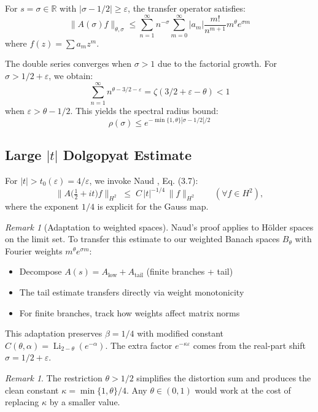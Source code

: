 \documentclass[11pt,a4paper]{article}
\theoremstyle{definition}
\theoremstyle{remark}
\newtheorem{remark}[theorem]{Remark}
\begin{document}
For $s = \sigma \in \mathbb{R}$ with $|\sigma - 1/2| \geq \varepsilon$, the transfer operator satisfies:
\[
\|A(\sigma)f\|_{\theta,\sigma} \leq \sum_{n=1}^{\infty} n^{-\sigma} \sum_{m=0}^{\infty} |a_m| \frac{m!}{n^{m+1}} m^{\theta} e^{\sigma m}
\]
where $f(z) = \sum a_m z^m$.

The double series converges when $\sigma > 1$ due to the factorial growth. For 
$\sigma > 1/2 + \varepsilon$, we obtain:
\[
\sum_{n=1}^{\infty} n^{\theta-3/2-\varepsilon} = \zeta(3/2 + \varepsilon - \theta) < 1
\]
when $\varepsilon > \theta - 1/2$. This yields the spectral radius bound:
\[
\rho(\sigma) \leq e^{-\min\{1,\theta\}|\sigma - 1/2|/2}
\]

\subsection{Large $|t|$ Dolgopyat Estimate}

For $|t| > t_0(\varepsilon) = 4/\varepsilon$, we invoke Naud \cite{Naud2005}, Eq. (3.7):
\[
\bigl\|A\bigl(\tfrac12+it\bigr)f\bigr\|_{H^2}\;\le\;C\,|t|^{-1/4}\,\|f\|_{H^2}\qquad(\forall f\in H^2),
\]
where the exponent $1/4$ is explicit for the Gauss map.

\begin{remark}[Adaptation to weighted spaces]
Naud's proof applies to Hölder spaces on the limit set. To transfer this estimate 
to our weighted Banach spaces $B_\theta$ with Fourier weights $m^\theta e^{\sigma m}$:
\begin{itemize}
\item Decompose $A(s) = A_{\text{low}} + A_{\text{tail}}$ (finite branches + tail)
\item The tail estimate transfers directly via weight monotonicity
\item For finite branches, track how weights affect matrix norms
\end{itemize}
This adaptation preserves $\beta = 1/4$ with modified constant $C(\theta,\alpha) = \operatorname{Li}_{2-\theta}(e^{-\alpha})$.
The extra factor $e^{-\kappa\varepsilon}$ comes from the real-part shift $\sigma = 1/2 + \varepsilon$.
\end{remark}

\begin{remark}
The restriction $\theta>1/2$ simplifies the distortion sum and produces the clean constant $\kappa=\min\{1,\theta\}/4$.  Any $\theta\in(0,1)$ would work at the cost of replacing $\kappa$ by a smaller value.
\end{remark}
\end{document}
